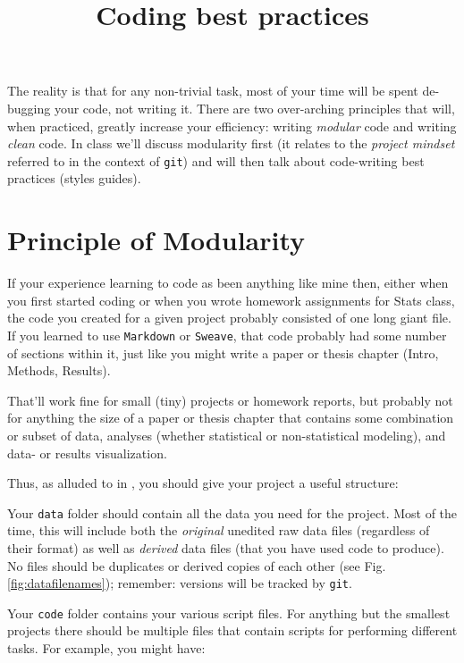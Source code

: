 \documentclass[12pt,letterpaper]{article}
\title{Coding best practices}
\begin{document}
\maketitle

\tableofcontents

\pagebreak

The reality is that for any non-trivial task, most of your time will be spent de-bugging your code, not
writing it.  There are two over-arching principles that will, when practiced, greatly increase your
efficiency:  writing \emph{modular} code and writing \emph{clean} code.  In class we'll discuss
modularity first (it relates to the \emph{project mindset} referred to in the context of \texttt{git}) and will
then talk about code-writing best practices (styles guides).

\section{Principle of Modularity}
If your experience learning to code as been anything like mine then, either when you first started coding or when you wrote homework assignments for Stats class, the code you created for a given project probably consisted of one long giant file.  If you learned to use \texttt{Markdown} or \texttt{Sweave}, that code probably had some number of sections within it, just like you might write a paper or thesis chapter (Intro, Methods, Results).

That'll work fine for small (tiny) projects or homework reports, but probably not for anything the size of a paper or thesis chapter that contains some combination or subset of data, analyses (whether statistical or non-statistical modeling), and data- or results visualization.

Thus, as alluded to in , you should give your project a useful structure:

Your \texttt{data} folder should contain all the data you need for the project.  Most of the time, this will include both the \emph{original} unedited raw data files (regardless of their format) as well as \emph{derived} data files (that you have used code to produce).  No files should be duplicates or derived copies of each other (see Fig. \ref{fig:datafilenames}); remember: versions will be tracked by \texttt{git}.

Your \texttt{code} folder contains your various script files.  For anything but the smallest projects there should be multiple files that contain scripts for performing different tasks.  For example, you might have:
\end{document}

